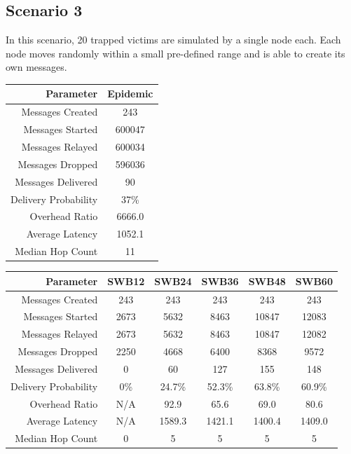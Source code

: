 \documentclass{article}
\begin{document}
\restoregeometry

\clearpage

\subsection{Scenario 3}
In this scenario, 20 trapped victims are simulated by a single node each. Each node moves randomly within a small pre-defined range and is able to create its own messages.

\begin{center}
\vspace{6px}
\begin{tabular}{|r|c|}
\hline
\textbf{Parameter} & \textbf{Epidemic} \\ \hline
Messages Created & 243 \\ \hline
Messages Started & 600047 \\ \hline
Messages Relayed & 600034 \\ \hline
Messages Dropped & 596036 \\ \hline
Messages Delivered & 90 \\ \hline
Delivery Probability & 37\%\\ \hline
Overhead Ratio & 6666.0 \\ \hline
Average Latency & 1052.1 \\ \hline
Median Hop Count & 11 \\ \hline
\end{tabular}
\end{center}

\begin{center}
\vspace{6px}
\begin{tabular}{|r|c|c|c|c|c|}
\hline
\textbf{Parameter} & \textbf{SWB12} & \textbf{SWB24} & \textbf{SWB36} & \textbf{SWB48} & \textbf{SWB60} \\ \hline
Messages Created & 243 & 243 & 243 & 243 & 243 \\ \hline
Messages Started & 2673 & 5632 & 8463 & 10847 & 12083 \\ \hline
Messages Relayed & 2673 & 5632 & 8463 & 10847 & 12082 \\ \hline
Messages Dropped & 2250 & 4668 & 6400 & 8368 & 9572 \\ \hline
Messages Delivered & 0 & 60 & 127 & 155 & 148 \\ \hline
Delivery Probability & 0\% & 24.7\% & 52.3\% & 63.8\% & 60.9\% \\ \hline
Overhead Ratio & N/A & 92.9 & 65.6 & 69.0 & 80.6 \\ \hline
Average Latency & N/A & 1589.3 & 1421.1 & 1400.4 & 1409.0 \\ \hline
Median Hop Count & 0 & 5 & 5 & 5 & 5 \\ \hline
\end{tabular}
\end{center}
\end{document}
